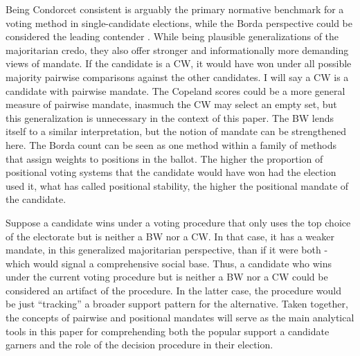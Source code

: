 \documentclass[hidelinks,11pt]{article} \usepackage[utf8]{inputenc}
\begin{document}
Being Condorcet consistent is arguably the primary normative benchmark for a
voting method in single-candidate elections, while the Borda perspective could
be considered the leading contender \parencite{regenwetter2006behavioral,
  felsenthal2011review, nurmi2002voting}. While being plausible generalizations
of the majoritarian credo, they also offer stronger and informationally more
demanding views of mandate. If the candidate is a CW, it would have won under
all possible majority pairwise comparisons against the other candidates. I will
say a CW is a candidate with pairwise mandate. The Copeland scores could be a
more general measure of pairwise mandate, inasmuch the CW may select an empty
set, but this generalization is unnecessary in the context of this paper. The BW
lends itself to a similar interpretation, but the notion of mandate can be
strengthened here. The Borda count can be seen as one method within a family of
methods that assign weights to positions in the ballot. The higher the
proportion of positional voting systems that the candidate would have won had
the election used it, what \textcite{tabarrok2001president} has called
positional stability, the higher the positional mandate of the candidate.

Suppose a candidate wins under a voting procedure that only uses the top choice
of the electorate but is neither a BW nor a CW. In that case, it has a weaker
mandate, in this generalized majoritarian perspective, than if it were both -
which would signal a comprehensive social base. Thus, a candidate who wins under
the current voting procedure but is neither a BW nor a CW could be considered an
artifact of the procedure. In the latter case, the procedure would be just
``tracking'' a broader support pattern for the alternative. Taken together, the concepts of pairwise and positional mandates will serve as the main analytical tools in this paper for comprehending both the popular support a candidate garners and the role of the decision procedure in their election.
\end{document}
